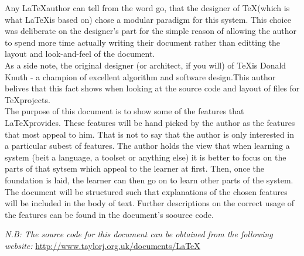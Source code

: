 Any \LaTeX author can tell from the word go, that the designer of \TeX (which is what \LaTeX is based on) chose a modular paradigm for this system. This choice was deliberate on the designer's part for the simple reason of allowing the author to spend more time actually writing their document rather than editting the layout and look-and-feel of the document.\\
\indent{}As a side note, the original designer (or architect, if you will) of \TeX is Donald Knuth - a champion of excellent algorithm and software design.This author belives that this fact shows when looking at the source code and layout of files for \TeX projects.\\
\indent{}The purpose of this document is to show some of the features that \LaTeX provides. These features will be hand picked by the author as the features that most appeal to him. That is not to say that the author is only interested in a particular subest of features. The author holds the view that when learning a system (beit a language, a toolset or anything else) it is better to focus on the parts of that sytsem which appeal to the learner at first. Then, once the foundation is laid, the learner can then go on to learn other parts of the system.\\
\indent{}The document will be structured such that explanations of the chosen features will be included in the body of text. Further descriptions on the correct usage of the features can be found in the document's soource code.
\begin{center}\emph{N.B: The source code for this document can be obtained from the following website:} \url{http://www.taylorj.org.uk/documents/LaTeX}\end{center}


